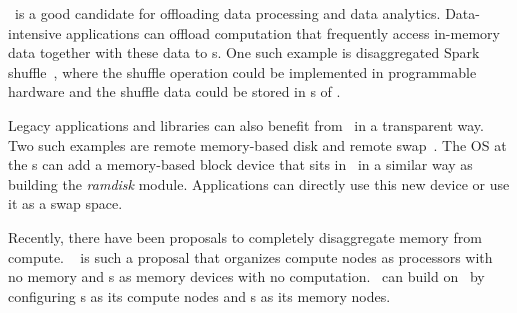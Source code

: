 \phdm\ is a good candidate for offloading data processing and data analytics. 
Data-intensive applications can offload computation that frequently access in-memory data together with 
these data to \MN{}s.
One such example is disaggregated Spark shuffle~\cite{Stuedi-ATC19}, where the shuffle
operation could be implemented in programmable hardware and the shuffle data could be 
stored in \MN{}s of \phdm.

Legacy applications and libraries can also benefit from \phdm\ in a transparent way.
Two such examples are remote memory-based disk and remote swap~\cite{InfiniSwap}.
The OS at the \CN{}s can add a memory-based block device that sits in \phdm\
in a similar way as building the {\em ramdisk} module.
Applications can directly use this new device or use it as a swap space.

Recently, there have been proposals to completely disaggregate memory from compute.
\lego~\cite{Shan18-OSDI} is such a proposal that organizes compute nodes as processors with no memory 
and \MN{}s as memory devices with no computation.
\lego\ can build on \phdm\ by configuring \CN{}s as its compute nodes %
and \MN{}s as its memory nodes. %


\fi
